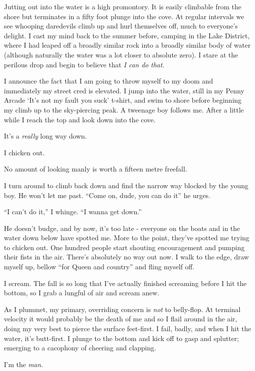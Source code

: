 \documentclass[a5paper,titlepage,11pt]{book}
\begin{document}
Jutting out into the water is a high promontory.  It is easily climbable from the shore but terminates in a fifty foot plunge into the cove.  At regular intervals we see whooping daredevils climb up and hurl themselves off, much to everyone's delight.  I cast my mind back to the summer before, camping in the Lake District, where I had leaped off a broadly similar rock into a broadly similar body of water (although naturally the water was a lot closer to absolute zero).  I stare at the perilous drop and begin to believe that \emph{I can do that}.

I announce the fact that I am going to throw myself to my doom and immediately my street cred is elevated.  I jump into the water, still in my Penny Arcade `It's not my fault you suck' t-shirt, and swim to shore before beginning my climb up to the sky-piercing peak.  A tweenage boy follows me.  After a little while I reach the top and look down into the cove.

It's a \emph{really} long way down.

I chicken out.

No amount of looking manly is worth a fifteen metre freefall.

I turn around to climb back down and find the narrow way blocked by the young boy.  He won't let me past. ``Come on, dude, you can do it'' he urges.

``I can't do it,'' I whinge.  ``I wanna get down.''

He doesn't budge, and by now, it's too late - everyone on the boats and in the water down below have spotted me.  More to the point, they've spotted me trying to chicken out.  One hundred people start shouting encouragement and pumping their fists in the air.  There's absolutely no way out now.  I walk to the edge, draw myself up, bellow ``for Queen and country'' and fling myself off.

I scream.  The fall is so long that I've actually finished screaming before I hit the bottom, so I grab a lungful of air and scream anew.

As I plummet, my primary, overriding concern is \emph{not} to belly-flop.  At terminal velocity it would probably be the death of me and so I flail around in the air, doing my very best to pierce the surface feet-first.  I fail, badly, and when I hit the water, it's butt-first.  I  plunge to the bottom and kick off to gasp and splutter; emerging to a cacophony of cheering and clapping.

I'm the \emph{man}.
\end{document}
